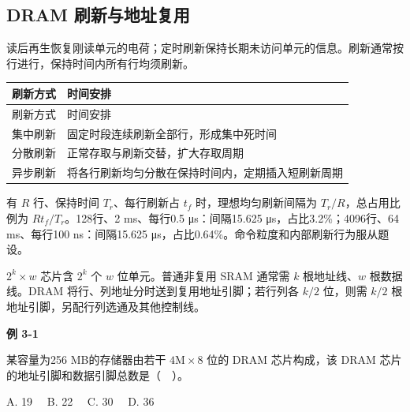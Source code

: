 \subsection{DRAM 刷新与地址复用}\label{CO03-dram}

读后再生恢复刚读单元的电荷；定时刷新保持长期未访问单元的信息。刷新通常按行进行，保持时间内所有行均须刷新。

\par\smallskip
{\fontsize{9.3}{12}\selectfont\setlength{\tabcolsep}{2.5pt}\setlength{\LTleft}{0pt}\setlength{\LTright}{0pt}
\begin{longtable}{@{}>{\raggedright\arraybackslash}p{}>{\raggedright\arraybackslash}p{}@{}}
\toprule
刷新方式 & 时间安排 \\

\midrule\endfirsthead\toprule
刷新方式 & 时间安排 \\

\midrule\endhead\bottomrule\endfoot
集中刷新 & 固定时段连续刷新全部行，形成集中死时间 \\

分散刷新 & 正常存取与刷新交替，扩大存取周期 \\

异步刷新 & 将各行刷新均匀分散在保持时间内，定期插入短刷新周期 \\

\end{longtable}}
\par\smallskip

有 \(R\) 行、保持时间 \(T_r\)、每行刷新占 \(t_f\) 时，理想均匀刷新间隔为 \(T_r/R\)，总占用比例为 \(Rt_f/T_r\)。128行、2 ms、每行0.5 μs：间隔15.625 μs，占比3.2\%；4096行、64 ms、每行100 ns：间隔15.625 μs，占比0.64\%。命令粒度和内部刷新行为服从题设。

\(2^k\times w\) 芯片含 \(2^k\) 个 \(w\) 位单元。普通非复用 SRAM 通常需 \(k\) 根地址线、\(w\) 根数据线。DRAM 将行、列地址分时送到复用地址引脚；若行列各 \(k/2\) 位，则需 \(k/2\) 根地址引脚，另配行列选通及其他控制线。

\par\medskip{}\noindent\hypertarget{CO03-E01}{}\label{CO03-E01}\textbf{例 3-1}\par\nobreak\smallskip

某容量为256 MB的存储器由若干 \(4\mathrm M\times8\) 位的 DRAM 芯片构成，该 DRAM 芯片的地址引脚和数据引脚总数是（　）。

A. 19　 B. 22　 C. 30　 D. 36

